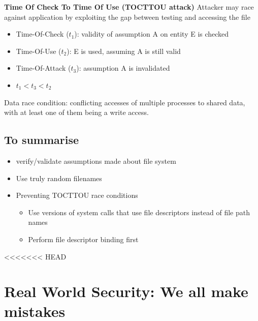 \documentclass{article}
\begin{document}
\textbf{Time Of Check To Time Of Use (TOCTTOU attack)}
Attacker may race against application by exploiting the gap between testing and accessing the file
\begin{itemize}
    \item Time-Of-Check ($t_1$): validity of assumption A on entity E is checked
    \item Time-Of-Use ($t_2$): E is used, assuming A is still valid
    \item Time-Of-Attack ($t_3$): assumption A is invalidated
    \item $t_1 < t_3 < t_2$
\end{itemize}
Data race condition: conflicting accesses of multiple processes to shared data, with at least one of them being a write access.

\subsection{To summarise}
\begin{itemize}
    \item verify/validate assumptions made about file system
    \item Use truly random filenames
    \item Preventing TOCTTOU race conditions
    \begin{itemize}
        \item Use versions of system calls that use file descriptors instead of file path names
        \item Perform file descriptor binding first
    \end{itemize}
\end{itemize}
<<<<<<< HEAD

\section{Real World Security: We all make mistakes}
\end{document}

